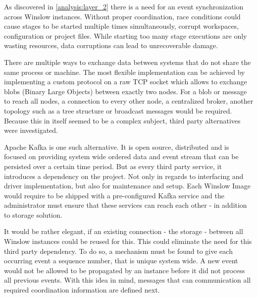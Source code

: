 As discovered in \autoref{analysis:layer_2} there is a need for an event synchronization across Winslow instances.
Without proper coordination, race conditions could cause stages to be started multiple times simultaneously, corrupt workspaces, configuration or project files.
While starting too many stage executions are only wasting resources, data corruptions can lead to unrecoverable damage.

There are multiple ways to exchange data between systems that do not share the same process or machine.
The most flexible implementation can be achieved by implementing a custom protocol on a raw TCP socket which allows to exchange blobs (Binary Large Objects) between exactly two nodes.
For a blob or message to reach all nodes, a connection to every other node, a centralized broker, another topology such as a tree structure or broadcast messages would be required.
Because this in itself seemed to be a complex subject, third party alternatives were investigated.

Apache Kafka\cite{kafka} is one such alternative.
It is open source, distributed and is focused on providing system wide ordered data and event stream that can be persisted over a certain time period.
But as every third party service, it introduces a dependency on the project.
Not only in regards to interfacing and driver implementation, but also for maintenance and setup.
Each Winslow Image would require to be shipped with a pre-configured Kafka service and the administrator must ensure that these services can reach each other - in addition to storage solution.

It would be rather elegant, if an existing connection - the storage - between all Winslow instances could be reused for this.
This could eliminate the need for this third party dependency.
To do so, a mechanism must be found to give each occurring event a sequence number, that is unique system wide.
A new event would not be allowed to be propagated by an instance before it did not process all previous events.
With this idea in mind, messages that can communication all required coordination information are defined  next.


